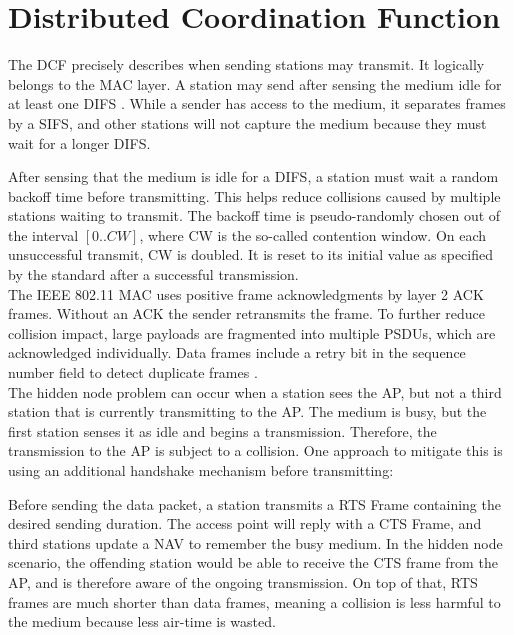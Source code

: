 
\section{Distributed Coordination Function}\label{sec:dcf}

The \gls{DCF} precisely describes when sending stations may transmit. It logically belongs to the \gls{MAC} layer. A station may send after sensing the medium idle for at least one \gls{DIFS} \cite{bianchi2000}. While a sender has access to the medium, it separates frames by a \gls{SIFS}, and other stations will not capture the medium because they must wait for a longer \gls{DIFS}.

After sensing that the medium is idle for a \gls{DIFS}, a station must wait a random backoff time before transmitting. This helps reduce collisions caused by multiple stations waiting to transmit. The backoff time is pseudo-randomly chosen out of the interval $[0..CW]$, where CW is the so-called contention window. On each unsuccessful transmit, CW is doubled. It is reset to its initial value as specified by the standard after a successful transmission.\\

The \gls{IEEE} 802.11 \gls{MAC} uses positive frame acknowledgments by layer 2 \gls{ACK} frames. Without an \gls{ACK} the sender retransmits the frame. To further reduce collision impact, large payloads are fragmented into multiple \glspl{PSDU}, which are acknowledged individually. Data frames include a retry bit in the sequence number field to detect duplicate frames \cite{perahia2013}.\\

The hidden node problem can occur when a station sees the \gls{AP}, but not a third station that is currently transmitting to the \gls{AP}. The medium is busy, but the first station senses it as idle and begins a transmission. Therefore, the transmission to the \gls{AP} is subject to a collision. One approach to mitigate this is using an additional handshake mechanism before transmitting:

Before sending the data packet, a station transmits a \gls{RTS} Frame containing the desired sending duration. The access point will reply with a \gls{CTS} Frame, and third stations update a \gls{NAV} to remember the busy medium. In the hidden node scenario, the offending station would be able to receive the \gls{CTS} frame from the \gls{AP}, and is therefore aware of the ongoing transmission. On top of that, \gls{RTS} frames are much shorter than data frames, meaning a collision is less harmful to the medium because less air-time is wasted.


